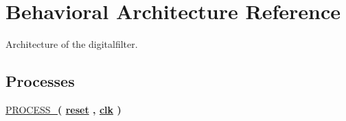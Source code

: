 \hypertarget{classdigitalfilter_1_1Behavioral}{\section{Behavioral Architecture Reference}
\label{classdigitalfilter_1_1Behavioral}
}


Architecture of the digitalfilter.  


\subsection*{Processes}
 \begin{DoxyCompactItemize}
\item 
\hypertarget{classdigitalfilter_1_1Behavioral_adca389b60e18a693052b1ecc5fbed9b0}{\hyperlink{classdigitalfilter_1_1Behavioral_adca389b60e18a693052b1ecc5fbed9b0}{P\-R\-O\-C\-E\-S\-S\-\_}{\bfseries  ( {\bfseries {\bfseries \hyperlink{classdigitalfilter_aae5de5c5aebf7b54ecd36feaba217215}{reset}} \textcolor{vhdlchar}{ }\textcolor{vhdlchar}{ }\textcolor{vhdlchar}{ }} , {\bfseries {\bfseries \hyperlink{classdigitalfilter_a8120037e0ee47c35ba2d79242209c72e}{clk}} \textcolor{vhdlchar}{ }} )}}\label{classdigitalfilter_1_1Behavioral_adca389b60e18a693052b1ecc5fbed9b0}

\end{DoxyCompactItemize}
